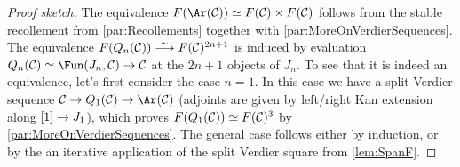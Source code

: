 \documentclass[a4paper, 10pt, oneside, DIV=9, chapterprefix=true, numbers=enddot,bibliography=totoc]{scrbook}
\begin{document}
\begin{proof}[Proof sketch]
	The equivalence $F(\Ar(\Cc))\simeq F(\Cc)\times F(\Cc)$ follows from the stable recollement from \cref{par:Recollements} together with \cref{par:MoreOnVerdierSequences}. The equivalence $F(Q_n(\Cc))\isomorphism F(\Cc)^{2n+1}$ is induced by evaluation $Q_n(\Cc)\simeq \Fun(J_n,\Cc)\morphism \Cc$ at the $2n+1$ objects of $J_n$. To see that it is indeed an equivalence, let's first consider the case $n=1$. In this case we have a split Verdier sequence $\Cc\morphism Q_1(\Cc)\morphism \Ar(\Cc)$ (adjoints are given by left/right Kan extension along $[1]\morphism J_1$), which proves $F(Q_1(\mathcal{C}))\simeq F(\mathcal{C})^3$ by \cref{par:MoreOnVerdierSequences}. The general case follows either by induction, or by the an iterative application of the split Verdier square from \cref{lem:SpanF}.
	
	

\end{proof}
\end{document}
